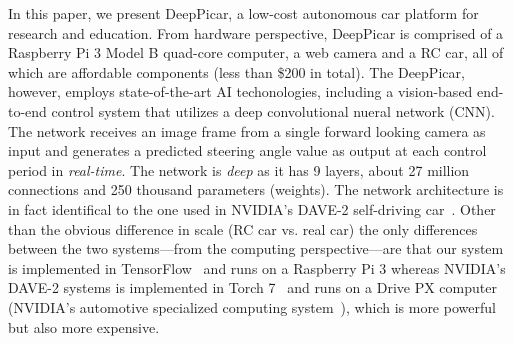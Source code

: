 
In this paper, we present DeepPicar, a low-cost autonomous car
platform for research and education. From hardware perspective, 
DeepPicar is comprised of a Raspberry Pi 3 Model B quad-core
computer, a web camera and a RC car, all of which are affordable
components (less than \$200 in total).
The DeepPicar, however, employs state-of-the-art AI
techonologies, including a vision-based end-to-end control system that
utilizes a deep convolutional nueral network (CNN).
The network receives an image frame from a single forward
looking camera as input and generates a predicted steering angle
value as output at each control period in \emph{real-time}. 
The network is \emph{deep} as it has 9 layers, about 27 million connections
and 250 thousand parameters (weights).
The network architecture is in fact identifical to the one
used in NVIDIA's DAVE-2 self-driving car~\cite{Bojarski2016}. Other
than the obvious difference in scale (RC car vs. real car) the only
differences between the two systems---from the computing
perspective---are that our system is implemented in 
TensorFlow~\cite{abadi2016tensorflow} and runs on a 
Raspberry Pi 3 whereas NVIDIA's DAVE-2 systems is implemented in Torch
7~\cite{collobert2011torch7} and runs on a Drive PX computer (NVIDIA's
automotive specialized computing system~\cite{drivepx}), which is more
powerful but also more expensive.

